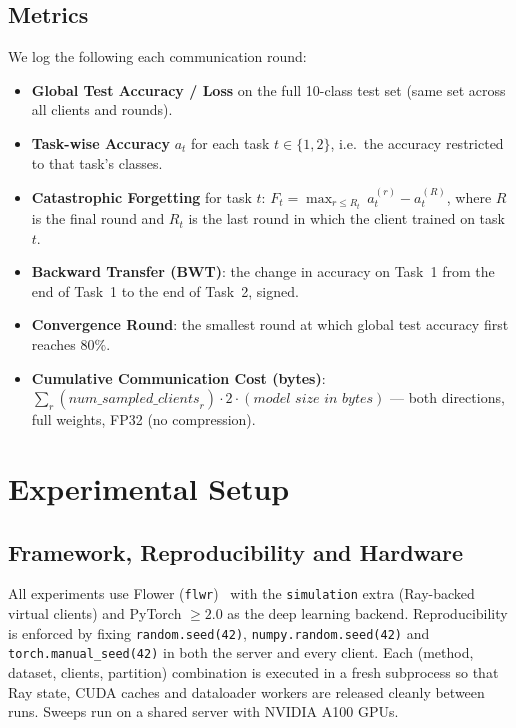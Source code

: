 \documentclass[journal]{IEEEtran}
\begin{document}
\subsection{Metrics}
\label{ssec:metrics}

We log the following each communication round:

\begin{itemize}
    \item \textbf{Global Test Accuracy / Loss} on the full 10-class
        test set (same set across all clients and rounds).
    \item \textbf{Task-wise Accuracy} $a_t$ for each task $t\!\in\!\{1,2\}$,
        i.e.\ the accuracy restricted to that task's classes.
    \item \textbf{Catastrophic Forgetting} for task $t$:
        $F_t = \max_{r\le R_t}\,a_t^{(r)} - a_t^{(R)}$,
        where $R$ is the final round and $R_t$ is the last round in
        which the client trained on task $t$.
    \item \textbf{Backward Transfer (BWT)}: the change in accuracy on
        Task~1 from the end of Task~1 to the end of Task~2, signed.
    \item \textbf{Convergence Round}: the smallest round at which
        global test accuracy first reaches $80\%$.
    \item \textbf{Cumulative Communication Cost (bytes)}:
        $\sum_r (\textit{num\_sampled\_clients}_r) \cdot 2 \cdot
        (\textit{model size in bytes})$ --- both directions, full
        weights, FP32 (no compression).
\end{itemize}

\section{Experimental Setup}
\label{sec:setup}

\subsection{Framework, Reproducibility and Hardware}

All experiments use Flower (\texttt{flwr})~\cite{flower} with the
\texttt{simulation} extra (Ray-backed virtual clients) and PyTorch
$\geq 2.0$ as the deep learning backend. Reproducibility is enforced
by fixing \texttt{random.seed(42)},
\texttt{numpy.random.seed(42)} and \texttt{torch.manual\_seed(42)} in
both the server and every client. Each (method, dataset, clients,
partition) combination is executed in a fresh subprocess so that Ray
state, CUDA caches and dataloader workers are released cleanly between
runs. Sweeps run on a shared server with NVIDIA A100 GPUs.
\end{document}
